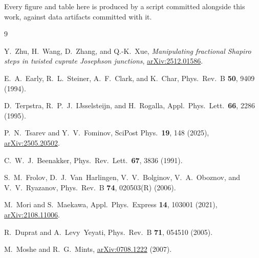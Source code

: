 \documentclass[aps,prb,twocolumn,superscriptaddress,floatfix,nofootinbib]{revtex4-2}
\begin{document}
\begin{acknowledgments}
Every figure and table here is produced by a script committed alongside this
work, against data artifacts committed with it.
\end{acknowledgments}

\begin{thebibliography}{9}

  Y.~Zhu, H.~Wang, D.~Zhang, and Q.-K.~Xue,
  \emph{Manipulating fractional Shapiro steps in twisted cuprate Josephson
  junctions},
  \href{https://arxiv.org/abs/2512.01586}{arXiv:2512.01586}.

  E.~A.~Early, R.~L.~Steiner, A.~F.~Clark, and K.~Char,
  Phys.\ Rev.\ B \textbf{50}, 9409 (1994).

  D.~Terpstra, R.~P.~J.~IJsselsteijn, and H.~Rogalla,
  Appl.\ Phys.\ Lett.\ \textbf{66}, 2286 (1995).

  P.~N.~Tsarev and Y.~V.~Fominov,
  SciPost Phys.\ \textbf{19}, 148 (2025),
  \href{https://arxiv.org/abs/2505.20502}{arXiv:2505.20502}.

  C.~W.~J.~Beenakker,
  Phys.\ Rev.\ Lett.\ \textbf{67}, 3836 (1991).

  S.~M.~Frolov, D.~J.~Van~Harlingen, V.~V.~Bolginov, V.~A.~Oboznov, and
  V.~V.~Ryazanov,
  Phys.\ Rev.\ B \textbf{74}, 020503(R) (2006).

  M.~Mori and S.~Maekawa,
  Appl.\ Phys.\ Express \textbf{14}, 103001 (2021),
  \href{https://arxiv.org/abs/2108.11006}{arXiv:2108.11006}.

  R.~Duprat and A.~Levy~Yeyati,
  Phys.\ Rev.\ B \textbf{71}, 054510 (2005).

  M.~Moshe and R.~G.~Mints,
  \href{https://arxiv.org/abs/0708.1222}{arXiv:0708.1222} (2007).

\end{thebibliography}
\end{document}
